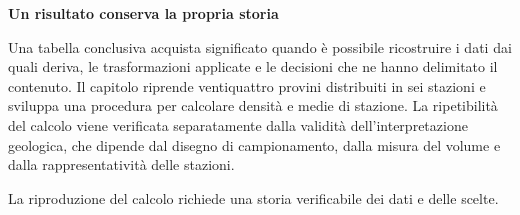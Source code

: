\documentclass[12pt,aspectratio=1610]{beamer}
\begin{document}
\begin{frame}[plain]
\end{frame}
\begin{lrbox}{\TitleBox}\begin{minipage}[t]{18.2cm}\raggedright\sloppy\color{Ink}\fontsize{20.7}{24}\selectfont \bfseries\color{Navy}Un risultato conserva la propria storia\end{minipage}\end{lrbox}
\begin{lrbox}{\BodyBox}\begin{minipage}[t]{10.25cm}\raggedright\sloppy\color{Ink}\fontsize{12.4}{16.4}\selectfont Una tabella conclusiva acquista significato quando è possibile ricostruire i dati dai quali deriva, le trasformazioni applicate e le decisioni che ne hanno delimitato il contenuto. Il capitolo riprende ventiquattro provini distribuiti in sei stazioni e sviluppa una procedura per calcolare densità e medie di stazione. La ripetibilità del calcolo viene verificata separatamente dalla validità dell’interpretazione geologica, che dipende dal disegno di campionamento, dalla misura del volume e dalla rappresentatività delle stazioni.\end{minipage}\end{lrbox}
\begin{lrbox}{\SideBox}\begin{minipage}[t]{7.45cm}\raggedright\sloppy\color{Ink}\fontsize{12.2}{16.1}\selectfont \end{minipage}\end{lrbox}
\begin{lrbox}{\RecallBox}\begin{minipage}[t]{16.45cm}\raggedright\sloppy\color{Ink}\fontsize{10.1}{13.2}\selectfont La riproduzione del calcolo richiede una storia verificabile dei dati e delle scelte.\end{minipage}\end{lrbox}
\end{document}
